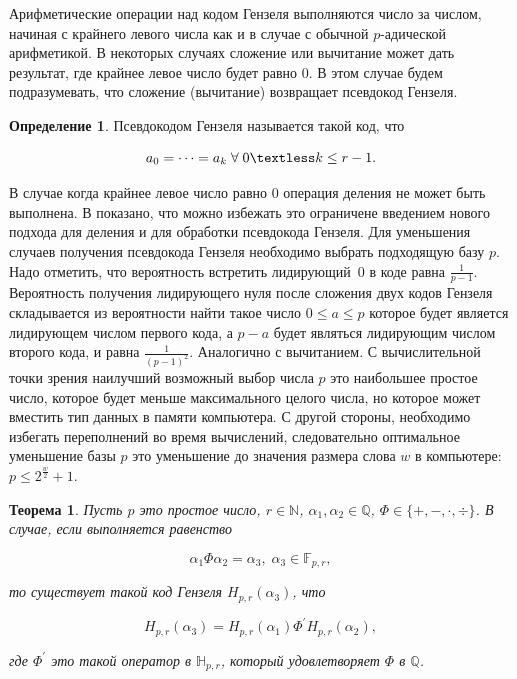 \documentclass[master, och, diploma, times]{sty/SCWorks}
\theoremstyle{plain}
\newtheorem{thethm}{Теорема}[section]
\theoremstyle{definition}
\newtheorem{defn}{Определение}[section]
\numberwithin{equation}{section}
\begin{document}
Арифметические операции над кодом Гензеля выполняются число за числом, начиная с крайнего левого числа как и в случае с обычной $p$-адической арифметикой. В некоторых случаях сложение или вычитание может дать результат, где крайнее левое число будет равно $0$. В этом случае будем подразумевать, что сложение (вычитание) возвращает псевдокод Гензеля.

\begin{defn}
Псевдокодом Гензеля называется такой код, что 

\begin{equation}
a_0=\dots=a_k \; \forall \; 0 \textless k \leq r-1.
\end{equation}

\end{defn}

В случае когда крайнее левое число равно $0$ операция деления не может быть выполнена. В \cite{bib:numbers:limongelli} показано, что можно избежать это ограничене \mbox{введением} нового подхода для деления и для обработки псевдокода \mbox{Гензеля}.
Для уменьшения случаев получения псевдокода Гензеля \mbox{необходимо} выбрать подходящую базу $p$. Надо отметить, что вероятность встретить \mbox{лидирующий $0$} в коде равна $\frac{1}{p-1}$. Вероятность получения лидирующего нуля после \mbox{сложения} двух кодов Гензеля складывается из вероятности найти такое число $0 \leq a \leq p$ которое будет является лидирующем числом первого кода, а $p-a$ будет являться лидирующим числом второго кода, и равна $\frac{1}{{(p-1)}^{2}}$. Аналогично с вычитанием. С вычислительной точки зрения наилучший возможный выбор числа $p$ это наибольшее простое число, которое будет меньше максимального целого числа, но которое может вместить  тип данных в памяти компьютера. С другой стороны, необходимо избегать переполнений во время вычислений, следовательно оптимальное уменьшение базы $p$ это уменьшение до значения размера слова $w$ в компьютере: $p \leq 2^\frac{w}{2}+1$.

\begin{thethm}\label{th:hensel}
Пусть $p$ это простое число, $r \in \mathbb{N}$, $\alpha_1, \alpha_2 \in \mathbb{Q}$, $\Phi \in \{+, -, \cdot , \div \}$. В случае, если выполняется равенство

\begin{equation}
\alpha_1\Phi \alpha_2 = \alpha_3, \; \alpha_3 \in \mathbb{F}_{p,r},
\end{equation}

\noindent то существует такой код Гензеля $H_{p,r}(\alpha_3)$, что

\begin{equation}
H_{p,r}(\alpha_3)=H_{p,r}(\alpha_1)\Phi^{'}H_{p,r}(\alpha_2),
\end{equation}

\noindent где $\Phi^{'}$ это такой оператор в $\mathbb{H}_{p,r}$, который удовлетворяет $\Phi$ в $\mathbb{Q}$.

\end{thethm}
\end{document}
